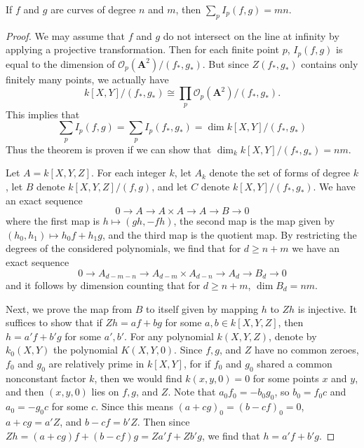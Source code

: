 \begin{theorem}
    If $f$ and $g$ are curves of degree $n$ and $m$, then $\sum_p I_p(f,g) = mn$.
\end{theorem}
\begin{proof}
    We may assume that $f$ and $g$ do not intersect on the line at infinity by applying a projective transformation. Then for each finite point $p$, $I_p(f,g)$ is equal to the dimension of $\mathcal{O}_p(\mathbf{A}^2)/(f_*,g_*)$. But since $Z(f_*,g_*)$ contains only finitely many points, we actually have
    \[ k[X,Y]/(f_*,g_*) \cong \prod_p \mathcal{O}_p(\mathbf{A}^2)/(f_*,g_*). \]
    This implies that
    \[ \sum_p I_p(f,g) = \sum_p I_p(f_*,g_*) = \dim k[X,Y]/(f_*,g_*) \]
    Thus the theorem is proven if we can show that $\dim_k k[X,Y]/(f_*,g_*) = nm$.

    Let $A = k[X,Y,Z]$. For each integer $k$, let $A_k$ denote the set of forms of degree $k$, let $B$ denote $k[X,Y,Z]/(f,g)$, and let $C$ denote $k[X,Y]/(f_*,g_*)$. We have an exact sequence
    \[ 0 \to A \to A \times A \to A \to B \to 0 \]
    where the first map is $h \mapsto (gh,-fh)$, the second map is the map given by $(h_0,h_1) \mapsto h_0f + h_1g$, and the third map is the quotient map. By restricting the degrees of the considered polynomials, we find that for $d \geq n + m$ we have an exact sequence
    \[ 0 \to A_{d-m-n} \to A_{d-m} \times A_{d-n} \to A_d \to B_d \to 0 \]
    and it follows by dimension counting that for $d \geq n + m$, $\dim B_d = nm$.

    Next, we prove the map from $B$ to itself given by mapping $h$ to $Zh$ is injective. It suffices to show that if $Zh = af + bg$ for some $a,b \in k[X,Y,Z]$, then $h = a'f + b'g$ for some $a',b'$. For any polynomial $k(X,Y,Z)$, denote by $k_0(X,Y)$ the polynomial $K(X,Y,0)$. Since $f,g$, and $Z$ have no common zeroes, $f_0$ and $g_0$ are relatively prime in $k[X,Y]$, for if $f_0$ and $g_0$ shared a common nonconstant factor $k$, then we would find $k(x,y,0) = 0$ for some points $x$ and $y$, and then $(x,y,0)$ lies on $f,g$, and $Z$. Note that $a_0f_0 = -b_0g_0$, so $b_0 = f_0c$ and $a_0 = -g_0c$ for some $c$. Since this means $(a + cg)_0 = (b - cf)_0 = 0$, $a + cg = a'Z$, and $b - cf = b'Z$. Then since $Zh = (a + cg)f + (b-cf)g = Za'f + Zb'g$, we find that $h = a'f + b'g$.


\end{proof}
